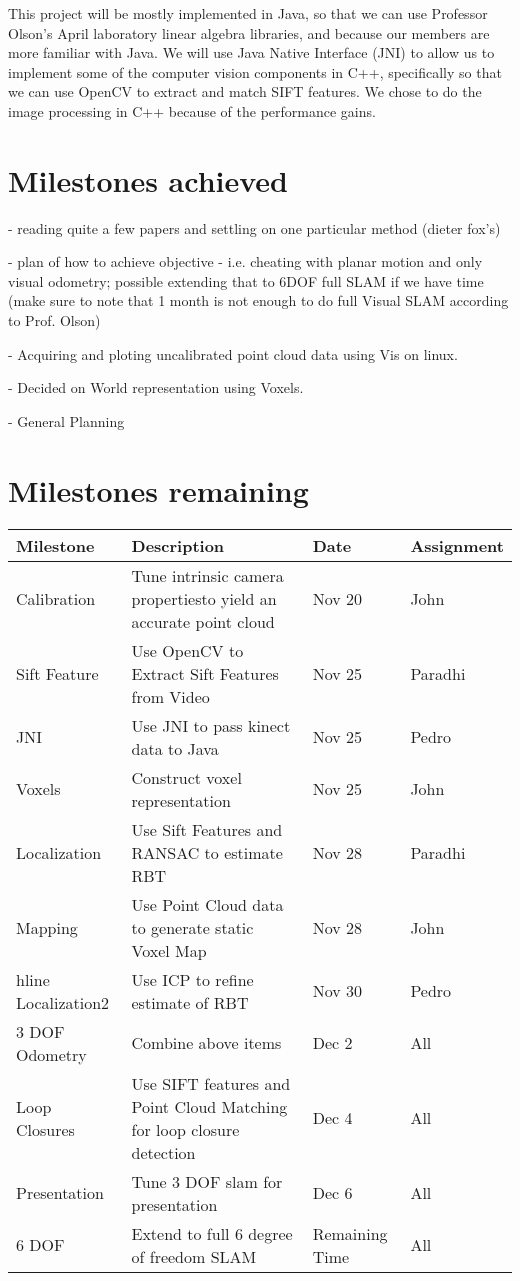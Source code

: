 \documentclass[12pt]{article}
\begin{document}
This project will be mostly implemented in Java, so that we can use Professor Olson's April laboratory linear algebra libraries, and because our members are more familiar with Java.  We will use Java Native Interface (JNI) to allow us to implement some of the computer vision components in C++, specifically so that we can use OpenCV to extract and match SIFT features. We chose to do the image processing in C++ because of the performance gains.

\section{Milestones achieved}
- reading quite a few papers and settling on one particular method (dieter fox's)

 - plan of how to achieve objective - i.e. cheating with planar motion and only visual odometry; possible extending that to 6DOF full SLAM if we have time (make sure to note that 1 month is not enough to do full Visual SLAM according to Prof. Olson)

- Acquiring and ploting uncalibrated point cloud data using Vis on linux.

- Decided on World representation using Voxels.

- General Planning

\section{Milestones remaining}
\begin{tabular}{|l |p{5cm}| |l| l|}
\hline
Milestone & Description & Date & Assignment \\ \hline
Calibration & Tune intrinsic camera properties\newline to yield an accurate point cloud & Nov 20 & John \\ \hline
Sift Feature & Use OpenCV to Extract Sift \newline Features from Video & Nov 25 & Paradhi \\ \hline
JNI & Use JNI to pass kinect data to Java & Nov 25 & Pedro \\ \hline
Voxels & Construct voxel representation & Nov 25 & John \\ \hline
Localization & Use Sift Features and RANSAC to \newline estimate RBT & Nov 28 & Paradhi \\ \hline
Mapping & Use Point Cloud data to generate \newline static Voxel Map & Nov 28 & John \\ hline
Localization2 & Use ICP to refine estimate of RBT & Nov 30 & Pedro \\ \hline
3 DOF Odometry & Combine above items & Dec 2 & All \\ \hline
Loop Closures & Use SIFT features and Point Cloud \newline Matching for loop closure detection & Dec 4 & All \\ \hline
Presentation & Tune 3 DOF slam for presentation & Dec 6 & All \\ \hline
6 DOF & Extend to full 6 degree of freedom SLAM & Remaining Time & All \\ \hline
\end{tabular}
\end{document}

